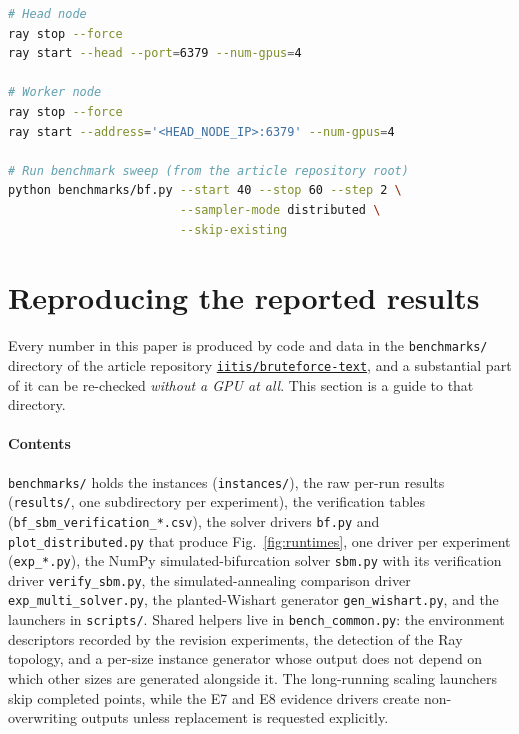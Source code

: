 \documentclass[preprint,12pt,a4paper]{elsarticle}
\newcommand{\datarepo}{https://github.com/iitis/bruteforce-text}
\newcommand{\datareponame}{\texttt{iitis/bruteforce-text}}
\begin{document}
\begin{lstlisting}[language=bash,caption={Ray startup and benchmark command used to produce Fig.~\ref{fig:runtimes}},label={lst:ray-commands}]
# Head node
ray stop --force
ray start --head --port=6379 --num-gpus=4

# Worker node
ray stop --force
ray start --address='<HEAD_NODE_IP>:6379' --num-gpus=4

# Run benchmark sweep (from the article repository root)
python benchmarks/bf.py --start 40 --stop 60 --step 2 \
                        --sampler-mode distributed \
                        --skip-existing
\end{lstlisting}

\section{Reproducing the reported results}
\label{sec:reproduction}
Every number in this paper is produced by code and data in the
\texttt{benchmarks/} directory of the article repository
\href{\datarepo}{\datareponame}, and a substantial part of it can be re-checked
\emph{without a GPU at all}. This section is a guide to that directory.

\paragraph{Contents}
\texttt{benchmarks/} holds the instances (\texttt{instances/}), the raw
per-run results (\texttt{results/}, one subdirectory per experiment), the
verification tables (\texttt{bf\_sbm\_verification\_*.csv}), the solver
drivers \texttt{bf.py} and \texttt{plot\_distributed.py} that produce
Fig.~\ref{fig:runtimes}, one driver per experiment
(\texttt{exp\_*.py}), the NumPy simulated-bifurcation solver \texttt{sbm.py}
with its verification driver \texttt{verify\_sbm.py}, the simulated-annealing
comparison driver \texttt{exp\_multi\_solver.py}, the planted-Wishart generator
\texttt{gen\_wishart.py}, and the launchers in
\texttt{scripts/}. Shared helpers live in \texttt{bench\_common.py}: the
environment descriptors recorded by the revision experiments, the detection of the Ray
topology, and a per-size instance generator whose output does not depend on
which other sizes are generated alongside it. The long-running scaling launchers
skip completed points, while the E7 and E8 evidence drivers create non-overwriting
outputs unless replacement is requested explicitly.
\end{document}
